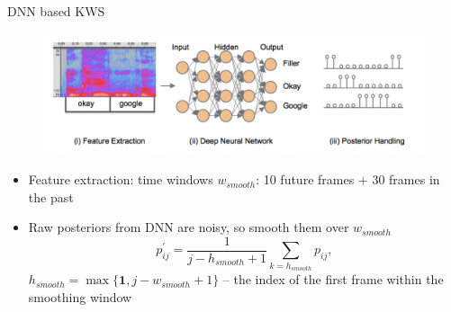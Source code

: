 \begin{frame}{DNN based KWS}
    \begin{figure}
    	\centering
    	\includegraphics[width=0.9\linewidth]{figs/dnn_kws.png}
    \end{figure}
    \begin{itemize}
        \item Feature extraction: time windows $w_{smooth}$: 10 future frames + 30 frames in the past
        \item Raw posteriors from DNN are noisy, so smooth them over $w_{smooth}$
         $$p_{i j}^{\prime}=\frac{1}{j-h_{s m o o t h}+1}\sum_{k=h_{smooth}}p_{i j},$$
         $h_{smooth}=\operatorname*{max}\{\mathbf{1},j-w_{s m o o t h}+1\}$ -- the index of the first frame within the smoothing window
    \end{itemize}
    

\end{frame}
